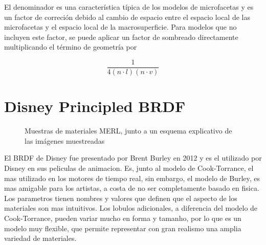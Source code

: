             El denominador es una caracter\'istica t\'ipica de los modelos de microfacetas y es un factor de correci\'on debido al cambio
            de espacio entre el espacio local de las microfacetas y el espacio local de la macrosuperficie. Para modelos que no
            incluyen este factor, se puede aplicar un factor de sombreado directamente multiplicando el t\'ermino de geometr\'ia por
    
            \begin{equation}
            \frac{1}{4(n\cdot{l}) (n\cdot{v})}
            \end{equation}
            \singlespacing
    
    
    
    \section{Disney Principled BRDF}
    
    \begin{figure}[H]
        \vspace{0.5cm}
        \centering
        \caption{Muestras de materiales MERL, junto a un esquema explicativo de las im\'agenes muestreadas}
        \vspace{0.5cm}
    \end{figure}
    
    El BRDF de Disney fue presentado por Brent Burley en 2012 y es el utilizado por Disney en sus peliculas de animacion. Es,
    junto al modelo de Cook-Torrance, el mas utilizado en los motores de tiempo real, sin embargo, el modelo de Burley, es mas
    amigable para los artistas, a costa de no ser completamente basado en fisica. Los parametros tienen nombres y valores que
    definen que el aspecto de los materiales son mas intuitivos. Los lobulos adicionales, a diferencia del modelo de Cook-Torrance,
    pueden variar mucho en forma y tamanho, por lo que es un modelo muy flexible, que permite representar con gran realismo una
    amplia variedad de materiales.\\
    

